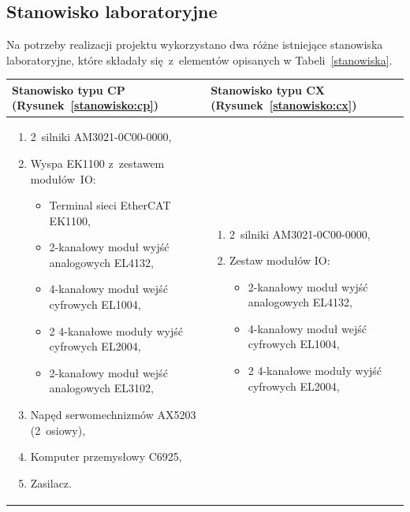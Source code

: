 \subsection{Stanowisko laboratoryjne}
Na potrzeby realizacji projektu wykorzystano dwa różne istniejące stanowiska laboratoryjne, które składały się~z~elementów opisanych w Tabeli~\ref{stanowiska}.
\begin{table}[!htb]
\begin{center}
\begin{tabular}{| p{} | p{} |}\hline
Stanowisko typu CP (Rysunek~\ref{stanowisko:cp}) & Stanowisko typu CX (Rysunek~\ref{stanowisko:cx})  \\\hline
\begin{enumerate}[leftmargin=7mm]
\setlength{\itemsep}{5pt}
\setlength{\parskip}{0pt}
\setlength{\parsep}{0pt}
\item 2~silniki AM3021-0C00-0000,
\item Wyspa EK1100 z~zestawem modułów~IO:
\begin{itemize}[leftmargin=3mm]
\setlength{\itemsep}{3pt}
\setlength{\parskip}{0pt}
\setlength{\parsep}{0pt}
\item Terminal sieci EtherCAT EK1100,
\item 2-kanałowy moduł wyjść analogowych EL4132,
\item 4-kanałowy moduł wejść cyfrowych EL1004,
\item 2 4-kanałowe moduły wyjść cyfrowych EL2004,
\item 2-kanałowy moduł wejść analogowych EL3102,
\end{itemize}
\item Napęd serwomechnizmów AX5203 (2~osiowy),
\item Komputer przemysłowy C6925,
\item Zasilacz.
\end{enumerate}
&
\begin{enumerate}[leftmargin=7mm]
\setlength{\itemsep}{5pt}
\setlength{\parskip}{0pt}
\setlength{\parsep}{0pt}
\item 2~silniki AM3021-0C00-0000,
\item Zestaw modułów IO:
\begin{itemize}[leftmargin=3mm]
\setlength{\itemsep}{3pt}
\setlength{\parskip}{0pt}
\setlength{\parsep}{0pt}
\item 2-kanałowy moduł wyjść analogowych EL4132,
\item 4-kanałowy moduł wejść cyfrowych EL1004,
\item 2 4-kanałowe moduły wyjść cyfrowych EL2004,

\end{itemize}
\end{enumerate}
\end{tabular}
\end{center}
\end{table}

